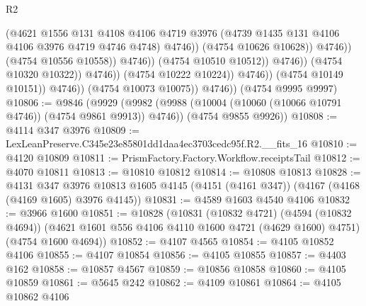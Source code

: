 \begin{lexlean}{R2}
\begin{coremodule}
                                                (@4621
                                                  @1556
                                                  @131
                                                  @4108
                                                  @4106
                                                  @4719
                                                  @3976
                                                  (@4739
                                                    @1435
                                                    @131
                                                    @4106
                                                    @4106
                                                    @3976
                                                    @4719
                                                    @4746
                                                    @4748)
                                                  @4746))
                                              (@4754 @10626 @10628))
                                            @4746))
                                        (@4754 @10556 @10558))
                                      @4746))
                                  (@4754 @10510 @10512))
                                @4746))
                            (@4754 @10320 @10322))
                          @4746))
                      (@4754 @10222 @10224))
                    @4746))
                (@4754 @10149 @10151))
              @4746))
          (@4754 @10073 @10075))
        @4746))
    (@4754 @9995 @9997)
@10806 := @9846
    (@9929
      (@9982 (@9988 (@10004 (@10060 (@10066 @10791 @4746)) (@4754 @9861 @9913)) @4746))
      (@4754 @9855 @9926))
@10808 := @4114 @347 @3976
@10809 := LexLeanPreserve.C345e23e85801dd1daa4ec3703cedc95f.R2.__fits_16
@10810 := @4120 @10809
@10811 := PrismFactory.Factory.Workflow.receiptsTail
@10812 := @4070 @10811
@10813 := @10810 @10812
@10814 := @10808 @10813
@10828 := @4131
    @347
    @3976
    @10813
    @1605
    @4145
    (@4151 (@4161 @347))
    (@4167 (@4168 (@4169 @1605) @3976 @4145))
@10831 := @4589 @1603 @4540 @4106
@10832 := @3966 @1600
@10851 := @10828
    (@10831
      (@10832 @4721)
      (@4594 (@10832 @4694))
      (@4621 @1601 @556 @4106 @4110 @1600 @4721 (@4629 @1600) @4751)
      (@4754 @1600 @4694))
@10852 := @4107 @4565
@10854 := @4105 @10852 @4106
@10855 := @4107 @10854
@10856 := @4105 @10855
@10857 := @4403 @162
@10858 := @10857 @4567
@10859 := @10856 @10858
@10860 := @4105 @10859
@10861 := @5645 @242
@10862 := @4109 @10861
@10864 := @4105 @10862 @4106

\end{coremodule}
\end{lexlean}
